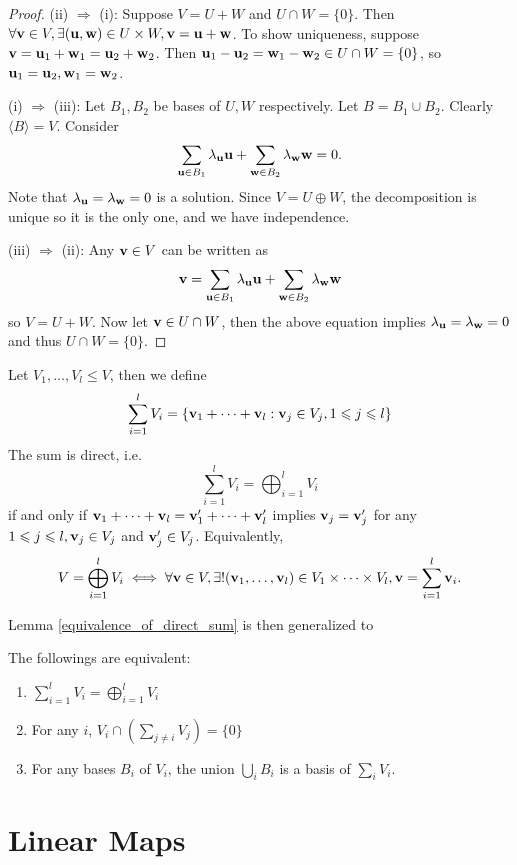 \documentclass[a4paper]{article}
\begin{document}
\begin{proof}
    (ii) $\Rightarrow$ (i): Suppose $V=U+W$ and $U\cap W=\{0\}$. Then $ \forall {\bf v}\in V,\exists ({\bf u},{\bf w})\in U\times W,{\bf v}={\bf u}+{\bf w} $. To show uniqueness, suppose $ {\bf v}={\bf u}_1+{\bf w}_1={\bf u}_2+{\bf w}_2 $. Then $ {\bf u}_1-{\bf u}_2={\bf w}_1-{\bf w}_2\in U \cap W=\{0\} $, so $ {\bf u}_1={\bf u}_2,{\bf w}_1={\bf w}_2$.

    (i) $\Rightarrow$ (iii): Let $ B_1,B_2 $ be bases of $U,W$ respectively. Let $ B=B_1 \cup B_2 $. Clearly $ \langle B \rangle =V $. Consider 
    \[
        \sum_{{\bf u}\in B_1}\lambda_{{\bf u}}{\bf u}+\sum_{{\bf w}\in B_2}\lambda_{{\bf w}}{\bf w}=0.
    \]
    Note that $ \lambda_{\bf u}=\lambda_{\bf w}=0 $ is a solution. Since $ V =U\oplus W $, the decomposition is unique so it is the only one, and we have independence.

    (iii) $\Rightarrow$ (ii): Any ${\bf v}\in V$ can be written as 
    \[
        {\bf v}=\sum_{{\bf u}\in B_1}\lambda_{{\bf u}}{\bf u}+\sum_{{\bf w}\in B_2}\lambda_{{\bf w}}{\bf w}
    \]
    so $ V=U+W $. Now let $ {\bf v}\in U\cap W $, then the above equation implies $\lambda_{\bf u}=\lambda_{\bf w}=0 $ and thus $ U\cap W=\{0\} $.
\end{proof}
\begin{definition}
    Let $V_1,\ldots,V_l\le V$, then we define
    $$\sum_{i=1}^lV_i=\{{\bf v}_1+\cdots+{\bf v}_l:{\bf v}_j\in V_j,1\leqslant j\leqslant l\}$$
    The sum is direct, i.e.
    $$\sum_{i=1}^lV_i=\bigoplus_{i=1}^lV_i$$
    if and only if ${\bf v}_1+\cdots +{\bf v}_l={\bf v}_1'+\cdots +{\bf v}_l'$ implies ${\bf v}_j={\bf v}_j'$ for any $1\leqslant j\leqslant l,{\bf v}_j\in V_j$ and $ {\bf v}_j'\in V_j $.
    Equivalently,
    $$V=\bigoplus_{i=1}^lV_i\iff \forall {\bf v}\in V,\exists!({\bf v}_1,\ldots,{\bf v}_l)\in V_1\times\cdots\times V_l,{\bf v}=\sum_{i=1}^l{\bf v}_i.$$
\end{definition}
Lemma \ref{equivalence_of_direct_sum} is then generalized to
\begin{proposition}
    The followings are equivalent:
    \begin{enumerate}
        \item $\sum_{i=1}^lV_i=\bigoplus_{i=1}^lV_i$
        \item For any $i$,
        $V_i\cap\left( \sum_{j\neq i}V_j \right)=\{0\}$
        \item For any bases $B_i$ of $V_i$, the union $\bigcup_iB_i$ is a basis of $\sum_iV_i$.
    \end{enumerate}
\end{proposition}

\section{Linear Maps}
\end{document}
